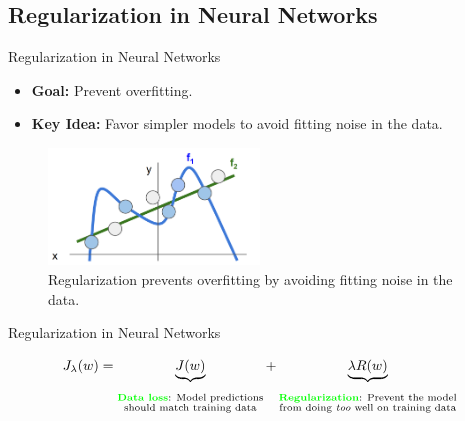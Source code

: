 \documentclass[serif, aspectratio=169]{beamer}
\begin{document}
\subsection{Regularization in Neural Networks}

\begin{frame}{Regularization in Neural Networks}
        \begin{itemize}
            \item \textbf{Goal:} Prevent overfitting.
            \item \textbf{Key Idea:} Favor simpler models to avoid fitting noise in the data.
        \end{itemize}

    \begin{figure}
        \centering
        \includegraphics[width=0.5\textwidth]{pic/Regularization-intuition.png}
        \caption{Regularization prevents overfitting by avoiding fitting noise in the data.}
        \label{fig:Regularization-intuition}
    \end{figure}
\end{frame}


\begin{frame}{Regularization in Neural Networks}
    
\begin{equation}
J_\lambda(w) = \underbrace{J(w)}_{{\substack{\vphantom{\text{Prevent the model}} \\ \text{\textcolor{green} {\textbf{Data loss}}: Model predictions} \\ \text{should match training data}}}} + \underbrace{\lambda R(w)}_{{\substack{\vphantom{\text{Prevent the model}} \\ \text{\textcolor{green} {\textbf{Regularization}}: Prevent the model} \\ \text{from doing \textit{too} well on training data}}}}
\end{equation}


\end{frame}
\end{document}
